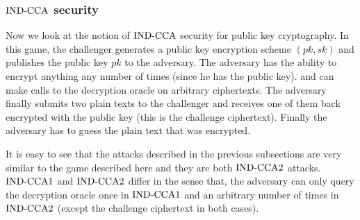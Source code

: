 \begin{center}
\end{center}

\subsubsection*{$\textnormal{IND-CCA}$ security}
Now we look at the notion of $\textnormal{IND-CCA}$ security for public key cryptography. In this game, the challenger generates a public key encryption scheme $(pk, sk)$ and publishes the public key $pk$ to the adversary. The adversary has the ability to encrypt anything any number of times (since he has the public key). and can make calls to the decryption oracle on arbitrary ciphertexts. The adversary finally submits two plain texts to the challenger and receives one of them back encrypted with the public key (this is the challenge ciphertext). Finally the adversary has to guess the plain text that was encrypted. \newline
 
 \indent It is easy to see that the attacks described in the previous subsections are very similar to the game described here and they are both $\textnormal{IND-CCA}2$ attacks. $\textnormal{IND-CCA}1$ and $\textnormal{IND-CCA}2$ differ in the sense that, the adversary can only query the decryption oracle once in $\textnormal{IND-CCA}1$ and an arbitrary number of times in $\textnormal{IND-CCA}2$ (except the challenge ciphertext in both cases).

